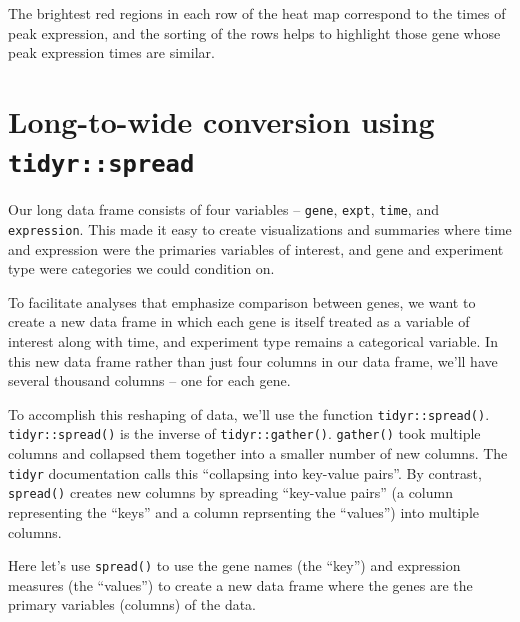 \documentclass[]{book}
\newenvironment{Shaded}{\begin{snugshade}}{\end{snugshade}}
\newcommand{\KeywordTok}[1]{\textcolor[rgb]{0.13,0.29,0.53}{\textbf{#1}}}
\newcommand{\NormalTok}[1]{#1}
\newcommand{\OperatorTok}[1]{\textcolor[rgb]{0.81,0.36,0.00}{\textbf{#1}}}
\newcommand{\StringTok}[1]{\textcolor[rgb]{0.31,0.60,0.02}{#1}}
\theoremstyle{definition}
\theoremstyle{definition}
\theoremstyle{definition}
\theoremstyle{remark}
\begin{document}
The brightest red regions in each row of the heat map correspond to the
times of peak expression, and the sorting of the rows helps to highlight
those gene whose peak expression times are similar.

\hypertarget{long-to-wide-conversion-using-tidyrspread}{%
\section{\texorpdfstring{Long-to-wide conversion using
\texttt{tidyr::spread}}{Long-to-wide conversion using tidyr::spread}}\label{long-to-wide-conversion-using-tidyrspread}}

Our long data frame consists of four variables -- \texttt{gene},
\texttt{expt}, \texttt{time}, and \texttt{expression}. This made it easy
to create visualizations and summaries where time and expression were
the primaries variables of interest, and gene and experiment type were
categories we could condition on.

To facilitate analyses that emphasize comparison between genes, we want
to create a new data frame in which each gene is itself treated as a
variable of interest along with time, and experiment type remains a
categorical variable. In this new data frame rather than just four
columns in our data frame, we'll have several thousand columns -- one
for each gene.

To accomplish this reshaping of data, we'll use the function
\texttt{tidyr::spread()}. \texttt{tidyr::spread()} is the inverse of
\texttt{tidyr::gather()}. \texttt{gather()} took multiple columns and
collapsed them together into a smaller number of new columns. The
\texttt{tidyr} documentation calls this ``collapsing into key-value
pairs''. By contrast, \texttt{spread()} creates new columns by spreading
``key-value pairs'' (a column representing the ``keys'' and a column
reprsenting the ``values'') into multiple columns.

Here let's use \texttt{spread()} to use the gene names (the ``key'') and
expression measures (the ``values'') to create a new data frame where
the genes are the primary variables (columns) of the data.

\begin{Shaded}
\end{Shaded}
\end{document}
